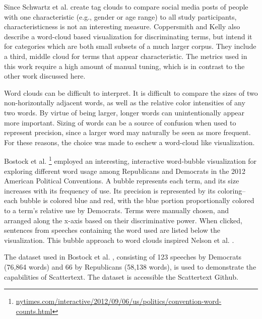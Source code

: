 \documentclass[11pt,a4paper]{article}
\begin{document}
Since Schwartz et al.  create tag clouds to compare social media posts of people with one characteristic (e.g., gender or age range) to all study participants,  characteristicness is not an interesting measure.  Coppersmith and Kelly  also describe a word-cloud based visualization for discriminating terms, but intend it for categories which are both small subsets of a much larger corpus. They include a third, middle cloud for terms that appear characteristic.  The metrics used in this work require a high amount of manual tuning, which is in contrast to the other work discussed here.

Word clouds can be difficult to interpret.  It is difficult to compare the sizes of two non-horizontally adjacent words,  as well as the relative color intensities of any two words. By virtue of being larger, longer words can unintentionally appear more important.  Sizing of words can be a source of confusion when used to represent precision, since a larger word may naturally be seen as more frequent.  For these reasons, the choice was made to eschew a word-cloud like visualization.

Bostock et al. \footnote{\href{http://www.nytimes.com/interactive/2012/09/06/us/politics/convention-word-counts.html}{nytimes.com/interactive/2012/09/06/us/politics/convention-word-counts.html}} employed an interesting, interactive word-bubble visualization for exploring different word usage among Republicans and Democrats in the 2012 American Political Conventions.  A bubble represents each term, and its size increases with its frequency of use.  Its precision is represented by its coloring-- each bubble is colored blue and red, with the blue portion proportionally colored to a term's relative use by Democrats.  Terms were manually chosen, and arranged along the x-axis based on their discriminative power. When clicked, sentences from speeches containing the word used are listed below the visualization.  This bubble approach to word clouds inspired Nelson et al. .

The dataset used in Bostock et al. , consisting of 123 speeches by Democrats (76,864 words) and 66 by Republicans (58,138 words), is used to demonstrate the capabilities of Scattertext.  The dataset is accessible the Scattertext Github.
\end{document}
